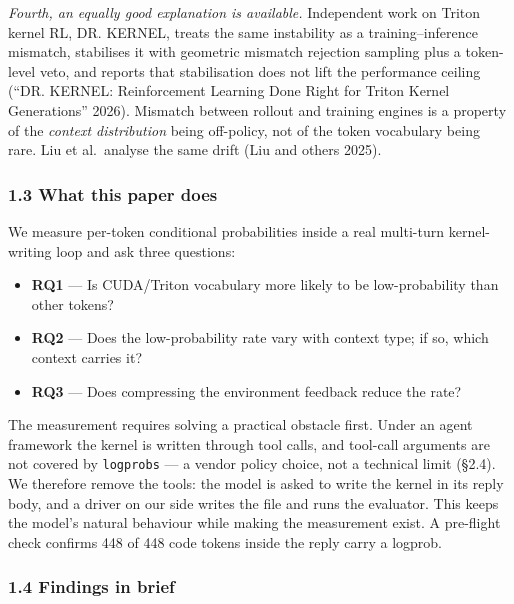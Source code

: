 \documentclass[
  11pt,
]{article}
\providecommand{\tightlist}{%
  \setlength{\itemsep}{0pt}\setlength{\parskip}{0pt}}
\begin{document}
\emph{Fourth, an equally good explanation is available.} Independent
work on Triton kernel RL, DR. KERNEL, treats the same instability as a
training--inference mismatch, stabilises it with geometric mismatch
rejection sampling plus a token-level veto, and reports that
stabilisation does not lift the performance ceiling ({``{DR. KERNEL}:
Reinforcement Learning Done Right for {Triton} Kernel Generations''}
2026). Mismatch between rollout and training engines is a property of
the \emph{context distribution} being off-policy, not of the token
vocabulary being rare. Liu et al.~analyse the same drift (Liu and others
2025).

\hypertarget{what-this-paper-does}{%
\subsubsection{1.3 What this paper does}\label{what-this-paper-does}}

We measure per-token conditional probabilities inside a real multi-turn
kernel-writing loop and ask three questions:

\begin{itemize}
\tightlist
\item
  \textbf{RQ1} --- Is CUDA/Triton vocabulary more likely to be
  low-probability than other tokens?
\item
  \textbf{RQ2} --- Does the low-probability rate vary with context type;
  if so, which context carries it?
\item
  \textbf{RQ3} --- Does compressing the environment feedback reduce the
  rate?
\end{itemize}

The measurement requires solving a practical obstacle first. Under an
agent framework the kernel is written through tool calls, and tool-call
arguments are not covered by \texttt{logprobs} --- a vendor policy
choice, not a technical limit (§2.4). We therefore remove the tools: the
model is asked to write the kernel in its reply body, and a driver on
our side writes the file and runs the evaluator. This keeps the model's
natural behaviour while making the measurement exist. A pre-flight check
confirms 448 of 448 code tokens inside the reply carry a logprob.

\hypertarget{findings-in-brief}{%
\subsubsection{1.4 Findings in brief}\label{findings-in-brief}}
\end{document}
